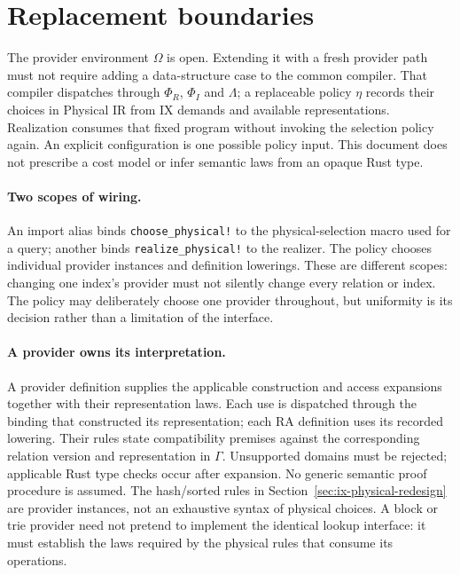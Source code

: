 \section{Replacement boundaries}
\label{sec:extensibility}
The provider environment $\Omega$ is open. Extending it with a fresh provider
path must not require adding a data-structure case to the common compiler.
That compiler dispatches through $\Phi_R$, $\Phi_I$ and $\Lambda$; a replaceable
policy $\eta$ records their choices in Physical IR from IX demands and
available representations. Realization consumes that fixed program without
invoking the selection policy again.
An explicit configuration is one possible policy input. This document does
not prescribe a cost model or infer semantic laws from an opaque Rust type.

\paragraph{Two scopes of wiring.}
An import alias binds \texttt{choose\_physical!} to the physical-selection macro
used for a query; another binds \texttt{realize\_physical!} to the realizer.
The policy chooses individual provider instances and definition lowerings.
These are
different scopes: changing one index's provider must not silently change every
relation or index. The policy may deliberately choose one provider throughout,
but uniformity is its decision rather than a limitation of the interface.

\paragraph{A provider owns its interpretation.}
A provider definition supplies the applicable construction and access
expansions together with their representation laws. Each use is dispatched
through the binding that constructed its representation; each RA definition
uses its recorded lowering. Their rules state compatibility premises against
the corresponding relation version and representation in $\Gamma$.
Unsupported domains must be rejected; applicable Rust type checks occur after
expansion. No generic semantic proof procedure is assumed.
The hash/sorted rules in Section~\ref{sec:ix-physical-redesign} are provider
instances, not an exhaustive syntax of physical choices. A block or trie
provider need not pretend to implement the identical lookup interface: it must
establish the laws required by the physical rules that consume its operations.

